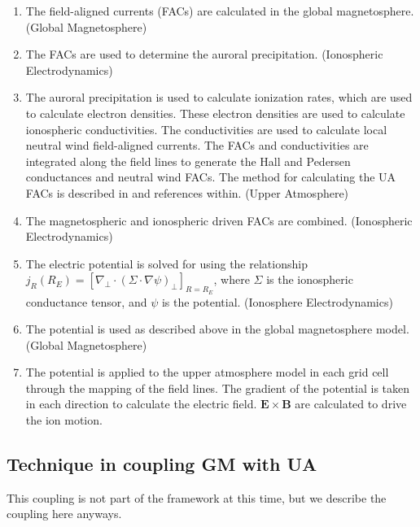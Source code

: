 \begin{enumerate}

\item
The field-aligned currents (FACs) are calculated in the global
magnetosphere.  (Global Magnetosphere)

\item
The FACs are used to determine the auroral precipitation. (Ionospheric
Electrodynamics)

\item
The auroral precipitation is used to calculate ionization rates, which
are used to calculate electron densities.  These electron densities
are used to calculate ionospheric conductivities.  The conductivities
are used to calculate local neutral wind field-aligned currents.  The
FACs and conductivities are integrated along the field lines to
generate the Hall and Pedersen conductances and neutral wind FACs.
The method for calculating the UA FACs is described in
\cite{ridley_coupled} and references within. (Upper Atmosphere)

\item
The magnetospheric and ionospheric driven FACs are combined. (Ionospheric
Electrodynamics)

\item
The electric potential is solved for using the relationship $j_R(R_E)
=[{\nabla}_{\perp}{\cdot}({\Sigma}{\cdot}{\nabla}{\psi})_{\perp}]_{R=R_E}$,
where $\Sigma$ is the ionospheric conductance tensor, and $\psi$ is
the potential. (Ionosphere Electrodynamics)

\item
The potential is used as described above in the global magnetosphere model.
(Global Magnetosphere)

\item
The potential is applied to the upper atmosphere model in each grid
cell through the mapping of the field lines.  The gradient of the
potential is taken in each direction to calculate the electric field.
$\mathbf{E} \times \mathbf{B}$ are calculated to drive the ion motion.

\end{enumerate}

\subsection{Technique in coupling GM with UA}

This coupling is not part of the framework at this time, but we describe
the coupling here anyways.

